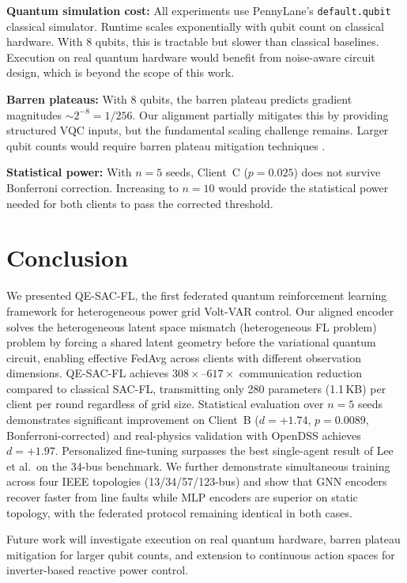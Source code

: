 \documentclass[journal]{IEEEtran}
\begin{document}
\textbf{Quantum simulation cost:} All experiments use PennyLane's
\texttt{default.qubit} classical simulator. Runtime scales exponentially
with qubit count on classical hardware. With 8 qubits, this is
tractable but slower than classical baselines.
Execution on real quantum hardware would benefit from noise-aware
circuit design, which is beyond the scope of this work.

\textbf{Barren plateaus:} With 8 qubits, the barren plateau predicts
gradient magnitudes $\sim 2^{-8} = 1/256$. Our alignment partially
mitigates this by providing structured VQC inputs, but the fundamental
scaling challenge remains. Larger qubit counts would require
barren plateau mitigation techniques \cite{mcclean2018barren}.

\textbf{Statistical power:} With $n=5$ seeds, Client~C ($p=0.025$)
does not survive Bonferroni correction. Increasing to $n=10$ would
provide the statistical power needed for both clients to pass
the corrected threshold.

\section{Conclusion}
\label{sec:conclusion}

We presented QE-SAC-FL, the first federated quantum reinforcement learning
framework for heterogeneous power grid Volt-VAR control.
Our aligned encoder solves the heterogeneous latent space mismatch (heterogeneous FL problem)
problem by forcing a shared latent geometry before the variational quantum
circuit, enabling effective FedAvg across clients with different observation
dimensions. QE-SAC-FL achieves $308\times$--$617\times$ communication
reduction compared to classical SAC-FL, transmitting only 280 parameters
(1.1\,KB) per client per round regardless of grid size.
Statistical evaluation over $n=5$ seeds demonstrates significant improvement
on Client~B ($d=+1.74$, $p=0.0089$, Bonferroni-corrected) and real-physics
validation with OpenDSS achieves $d=+1.97$.
Personalized fine-tuning surpasses the best single-agent result of Lee et al.\
on the 34-bus benchmark.
We further demonstrate simultaneous training across four IEEE topologies
(13/34/57/123-bus) and show that GNN encoders recover faster from line
faults while MLP encoders are superior on static topology, with the
federated protocol remaining identical in both cases.

Future work will investigate execution on real quantum hardware,
barren plateau mitigation for larger qubit counts, and extension to
continuous action spaces for inverter-based reactive power control.
\end{document}
